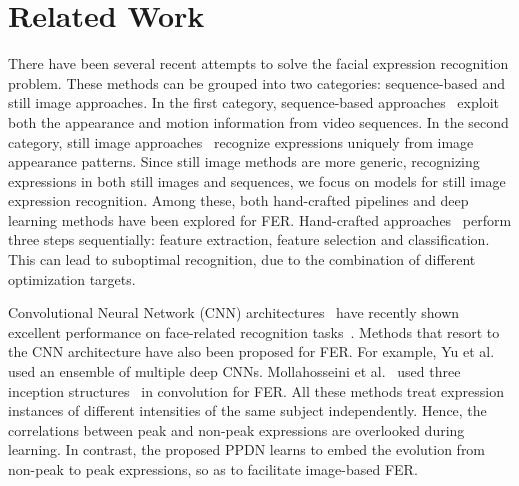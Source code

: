 \documentclass[runningheads]{llncs}
\begin{document}
\section{Related Work}

There have been several recent attempts to solve the facial expression 
recognition problem. These methods can be grouped into two categories: 
sequence-based and still image approaches. In the first category, 
sequence-based approaches~\cite{jung2015joint,liu2014learning,guo2012dynamic,zhao2011facial,klaser2008spatio}  exploit both the appearance and motion 
information from video sequences. In the second category, still image 
approaches~\cite{zhong2012learning,liu2014facial,kahou2014facial} recognize 
expressions uniquely from image appearance patterns. Since still image 
methods are more generic, recognizing 
expressions in both still images and sequences, we focus on models for 
still image expression recognition. Among these, both hand-crafted pipelines 
and deep learning methods have been explored for FER. Hand-crafted 
approaches~\cite{zhong2012learning,sikka2012exploring,shan2009facial} perform three steps sequentially: feature extraction, feature selection 
and classification. This can lead to suboptimal recognition, due to 
the combination of different optimization targets. %

Convolutional Neural Network (CNN) 
architectures~\cite{krizhevsky2012imagenet,szegedy2015going,simonyan2014very} 
have recently shown excellent performance on face-related recognition 
tasks~\cite{sun2014deep,zhu2013deep,yim2015rotating}. Methods that resort to the 
CNN architecture have also been proposed for FER. For example, Yu et 
al.~\cite{yu2015image} used an ensemble of multiple deep
CNNs. Mollahosseini et 
al.~\cite{mollahosseini2015going} used three inception 
structures~\cite{szegedy2015going} in convolution for FER. All these methods
treat expression instances of different intensities of the same subject 
independently. Hence, the correlations between peak and non-peak 
expressions are overlooked during learning. In contrast, the proposed PPDN 
learns to embed the evolution from non-peak to peak expressions, so as 
to facilitate image-based FER. 
\end{document}
